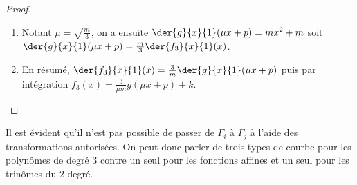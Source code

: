 \begin{proof}
\begin{enumerate}
\begin{enumerate}
		      		\item Notant $\mu = \sqrt{\frac{m}{3}}$, on a ensuite
				          $\der{g}{x}{1}(\mu x + p) = m x^2 + m$
				          soit
				          $\der{g}{x}{1}(\mu x + p) = \frac{m}{3} \der{f_3}{x}{1}(x)$.

		      		\item En résumé,
				          $\der{f_3}{x}{1}(x) = \frac{3}{m} \der{g}{x}{1}(\mu x + p)$
				          puis par intégration
				          $f_3(x) = \frac{3}{\mu m} g(\mu x + p) + k$.
		      \end{enumerate}
	\end{enumerate}
\end{proof}


Il est évident qu'il n'est pas possible de passer de $\Gamma_i$  à $\Gamma_j$ à l'aide des transformations autorisées.
On peut donc parler de trois types de courbe pour les polynômes de degré 3 contre un seul pour les fonctions affines et un seul pour les trinômes du 2\ieme{} degré.